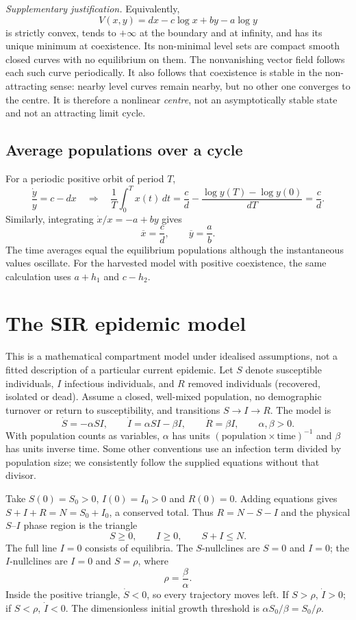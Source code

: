 \textit{Supplementary justification.} Equivalently,
\[
V(x,y)=dx-c\log x+by-a\log y
\]
is strictly convex, tends to $+\infty$ at the boundary and at infinity,
and has its unique minimum at coexistence. Its non-minimal level sets
are compact smooth closed curves with no equilibrium on them.
The nonvanishing vector field follows each such curve periodically.
It also follows that coexistence is stable in the non-attracting sense:
nearby level curves remain nearby, but no other one converges to the centre.
It is therefore a nonlinear \emph{centre}, not an asymptotically stable state
and not an attracting limit cycle.


\subsection{Average populations over a cycle}
For a periodic positive orbit of period $T$,
\[
\frac{\dot y}y=c-dx\quad\Longrightarrow\quad
\frac1T\int_0^T x(t)\,dt
=\frac cd-\frac{\log y(T)-\log y(0)}{dT}=\frac cd.
\]
Similarly, integrating $\dot x/x=-a+by$ gives
\[
\overline x=\frac cd,\qquad\overline y=\frac ab.
\]
The time averages equal the equilibrium populations although the instantaneous
values oscillate. For the harvested model with positive coexistence, the
same calculation uses $a+h_1$ and $c-h_2$.

\section{The SIR epidemic model}
This is a mathematical compartment model under idealised assumptions,
not a fitted description of a particular current epidemic.
Let $S$ denote susceptible individuals, $I$ infectious individuals, and
$R$ removed individuals (recovered, isolated or dead).
Assume a closed, well-mixed population, no demographic turnover or return
to susceptibility, and transitions $S\to I\to R$.
The model is
\begin{equation}\label{eq:applied-sir}
\dot S=-\alpha SI,\qquad
\dot I=\alpha SI-\beta I,\qquad
\dot R=\beta I,\qquad\alpha,\beta>0.
\end{equation}
With population counts as variables, $\alpha$ has units
$(\text{population}\times\text{time})^{-1}$ and $\beta$ has units inverse time.
Some other conventions use an infection term divided by population size;
we consistently follow the supplied equations without that divisor.

Take $S(0)=S_0>0$, $I(0)=I_0>0$ and $R(0)=0$.
Adding equations gives $S+I+R=N=S_0+I_0$, a conserved total.
Thus $R=N-S-I$ and the physical $S$--$I$ phase region is the triangle
\[
S\geq0,\qquad I\geq0,\qquad S+I\leq N.
\]
The full line $I=0$ consists of equilibria. The $S$-nullclines are $S=0$
and $I=0$; the $I$-nullclines are $I=0$ and $S=\rho$, where
\[
\rho=\frac\beta\alpha.
\]
Inside the positive triangle, $\dot S<0$, so every trajectory moves left.
If $S>\rho$, $\dot I>0$; if $S<\rho$, $\dot I<0$.
The dimensionless initial growth threshold is $\alpha S_0/\beta=S_0/\rho$.

